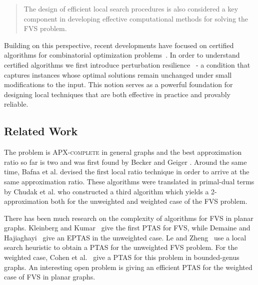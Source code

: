 \begin{quote}
The design of efficient local search procedures is also considered a key component 
in developing effective computational methods for solving the \textsc{FVS} problem.
\end{quote}

Building on this perspective, recent developments have focused on 
certified algorithms for combinatorial optimization problems~\cite{angelidakis2018bilu,bumpus_et_al:LIPIcs.SWAT.2024.19,Makarychev_Makarychev_2021}. 
In order to understand certified algorithms we first introduce 
perturbation resilience~\cite{bilu2012stable} - a condition that captures instances whose 
optimal solutions remain unchanged under small modifications to the input. 
This notion serves as a powerful foundation for designing local techniques that are 
both effective in practice and provably reliable.

\subsection*{Related Work}

The problem is \textsc{APX-complete} in general graphs
and the best approximation ratio so far is two and was first found by Becker and Geiger \cite{becker1996optimization}. Around the same time, Bafna et al. 
\cite{bafna1995constant} devised the first local ratio technique in order to arrive at the same approximation ratio. These algorithms were translated 
in primal-dual terms by Chudak et al. \cite{chudak1998primal} who constructed a third algorithm which yields a 2-approximation both for the unweighted and 
weighted case of the FVS problem. 

There has been much research on the complexity of algorithms for FVS in planar graphs. 
Kleinberg and Kumar~\cite{kleinberg2001wavelength} give the first PTAS for FVS, while 
Demaine and Hajiaghayi~\cite{demaine2005bidimensionality} give an EPTAS in the unweighted case.
Le and Zheng~\cite{le2020local} use a local search heuristic to obtain a PTAS for the 
unweighted FVS problem. For the weighted case, Cohen et al.~\cite{cohen2016approximating} give a 
PTAS for this problem in bounded-genus graphs. An interesting open problem is giving an efficient PTAS for 
the weighted case of FVS in planar graphs.

